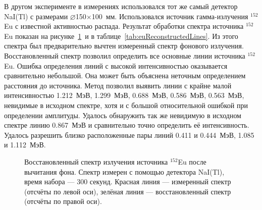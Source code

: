 В другом эксперименте в измерениях использовался тот же самый детектор NaI(Tl)  с размерами $\varnothing$150$\times$100~мм. Использовался источник гамма-излучения ${}^{152}$Eu с известной активностью распада. Результат обработки спектра источника ${}^{152}$Eu показан на рисунке~\ref{fig:euReconstructedSpectrum} и в таблице~\ref{tab:euReconstructedLines}. Из этого спектра был предварительно вычтен измеренный спектр фонового излучения. Восстановленный спектр позволил определить все основные линии источника ${}^{152}$Eu. Ошибка определения линий с высокой интенсивностью оказывается сравнительно небольшой. Она может быть объяснена  неточным  определением расстояния до источника. Метод позволил выявить линии с крайне малой интенсивностью 1.212~МэВ, 1.299~МэВ, 0.688~МэВ, 0.586~МэВ, 0.563~МэВ, невидимые в исходном спектре, хотя и с большой относительной ошибкой при определении амплитуды. Удалось обнаружить так же невидимую в исходном спектре линию 0.867~МэВ и сравнительно точно определить её интенсивность. Удалось разрешить близко расположенные пары линий 0.411 и 0.444~МэВ, 1.085 и 1.112~МэВ.~\cite{Khilkevitch2013}

\begin{figure}[ht!]
  \caption{ Восстановленный спектр излучения источника ${}^{152}$Eu после вычитания фона. Спектр измерен с помощью детектора NaI(Tl), время набора --- 300 секунд. Красная линия --- измеренный спектр (отсчёты по левой оси), зелёная линия --- восстановленный спектр (отсчёты по правой оси).~\cite{Khilkevitch2013} }
  \label{fig:euReconstructedSpectrum}
\end{figure}

